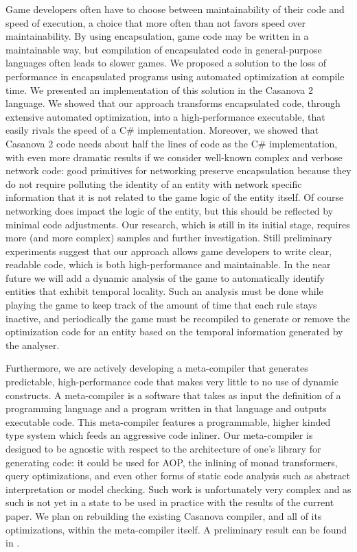 Game developers often have to choose between maintainability of their code and speed of execution, a choice that more often than not favors speed over maintainability. By using encapsulation, game code may be written in a maintainable way, but compilation of encapsulated code in general-purpose languages often leads to slower games. We proposed a solution to the loss of performance in encapsulated programs using automated optimization at compile time. 
We presented an implementation of this solution in the Casanova 2 language. We showed that our approach transforms encapsulated code, through extensive automated optimization, into a high-performance executable, that easily rivals the speed of a C\# implementation. Moreover, we showed that Casanova 2 code needs about half the lines of code as the C\# implementation, with even more dramatic results if we consider well-known complex and verbose network code: good primitives for networking preserve encapsulation because they do not require polluting the identity of an entity with network specific information that it is not related to the game logic of the entity itself. Of course networking does impact the logic of the entity, but this should be reflected by minimal code adjustments. Our research, which is still in its initial stage, requires more (and more complex) samples and further investigation. Still preliminary experiments suggest that our approach allows game developers to write clear, readable code, which is both high-performance and maintainable. In the near future we will add a dynamic analysis of the game to automatically identify entities that exhibit temporal locality. Such an analysis must be done while playing the game to keep track of the amount of time that each rule stays inactive, and periodically the game must be recompiled to generate or remove the optimization code for an entity based on the temporal information generated by the analyser. 

Furthermore, we are actively developing a meta-compiler that generates predictable, high-performance code that makes very little to no use of dynamic constructs. A meta-compiler is a software that takes as input the definition of a programming language and a program written in that language and outputs executable code. This meta-compiler features a programmable, higher kinded type system which feeds an aggressive code inliner. Our meta-compiler is designed to be agnostic with respect to the architecture of one's library for generating code: it could be used for AOP, the inlining of monad transformers, query optimizations, and even other forms of static code analysis such as abstract interpretation or model checking. Such work is unfortunately very complex and as such is not yet in a state to be used in practice with the results of the current paper. We plan on rebuilding the existing Casanova compiler, and all of its optimizations, within the meta-compiler itself. A preliminary result can be found in \cite{meta_casanova}.


